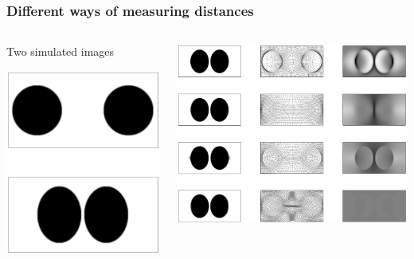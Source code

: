 \begin{frame}
\begin{columns}[c]
\end{columns}
\end{frame}

\begin{frame}
\frametitle{Different ways of measuring distances}
\begin{columns}[c]
\begin{center}
Two simulated images\par
\includegraphics[width=\textwidth]{figure2Di}
\end{center}
\includegraphics[width=\textwidth]{figure2Dii}
\end{columns}
\end{frame}

